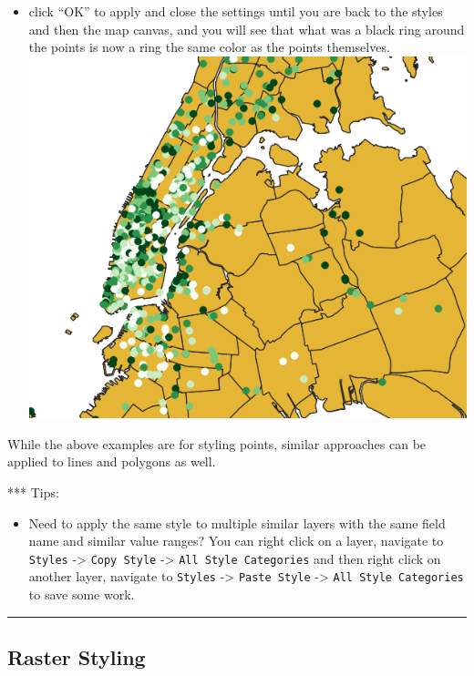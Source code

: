 \documentclass[
  letterpaper,
  DIV=11,
  numbers=noendperiod]{scrreprt}
\providecommand{\tightlist}{%
  \setlength{\itemsep}{0pt}\setlength{\parskip}{0pt}}\usepackage{longtable,booktabs,array}
\begin{document}
\begin{itemize}
\item
  click ``OK'' to apply and close the settings until you are back to the
  styles and then the map canvas, and you will see that what was a black
  ring around the points is now a ring the same color as the points
  themselves. \includegraphics{./images/points_same_outline_as_fill.png}
\end{itemize}

While the above examples are for styling points, similar approaches can
be applied to lines and polygons as well.

*** Tips:

\begin{itemize}
\tightlist
\item
  Need to apply the same style to multiple similar layers with the same
  field name and similar value ranges? You can right click on a layer,
  navigate to \texttt{Styles} -\textgreater{} \texttt{Copy\ Style}
  -\textgreater{} \texttt{All\ Style\ Categories} and then right click
  on another layer, navigate to \texttt{Styles} -\textgreater{}
  \texttt{Paste\ Style} -\textgreater{} \texttt{All\ Style\ Categories}
  to save some work.
\end{itemize}

\begin{center}\rule{0.5\linewidth}{0.5pt}\end{center}

\hypertarget{raster-styling}{%
\subsection{Raster Styling}\label{raster-styling}}
\end{document}
